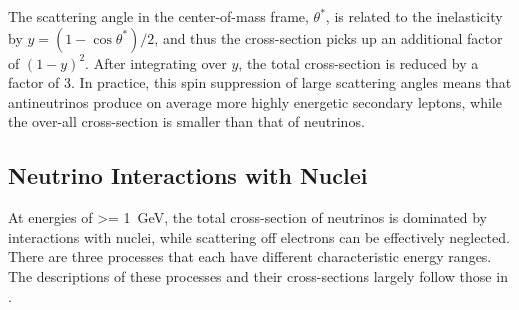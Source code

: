 The scattering angle in the center-of-mass frame, $\theta^*$, is related to the inelasticity by $y=(1-\cos\theta^*)/2$, and thus the cross-section picks up an additional factor of $(1 - y)^2$.
After integrating over $y$, the total cross-section is reduced by a factor of 3.
In practice, this spin suppression of large scattering angles means that antineutrinos produce on average more highly energetic secondary leptons, while the over-all cross-section is smaller than that of neutrinos.

\subsection{Neutrino Interactions with Nuclei}
\label{sec:neutrino-xsec}

At energies of \SI{>= 1}{\giga\eV}, the total cross-section of neutrinos is dominated by interactions with nuclei, while scattering off electrons can be effectively neglected.
There are three processes that each have different characteristic energy ranges.
The descriptions of these processes and their cross-sections largely follow those in .

